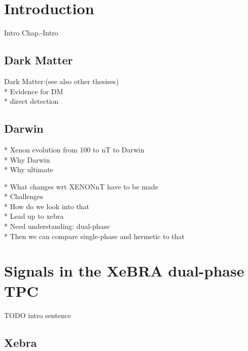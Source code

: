 \chapter{Introduction}
\label{chap:Intro}

Intro Chap.-Intro

\FloatBarrier
\section{Dark Matter}
\label{sec:DarkMatter}
\FloatBarrier

Dark Matter:(see also other thesises) \\
* Evidence for DM \\
* direct detection


\newpage
\FloatBarrier
\section{Darwin}
\label{sec:Darwin}
\FloatBarrier

* Xenon evolution from 100 to nT to Darwin \\
* Why Darwin \\
* Why ultimate

* What changes wrt XENONnT have to be made \\
* Challenges \\
* How do we look into that \\
* Lead up to xebra \\
* Need understanding: dual-phase \\
* Then we can compare single-phase and hermetic to that


\newpage
\FloatBarrier
\chapter{Signals in the XeBRA dual-phase TPC}
\label{chap:signals}

TODO intro sentence  %

\FloatBarrier
\section{Xebra}
\label{sec:Xebra}
\FloatBarrier

